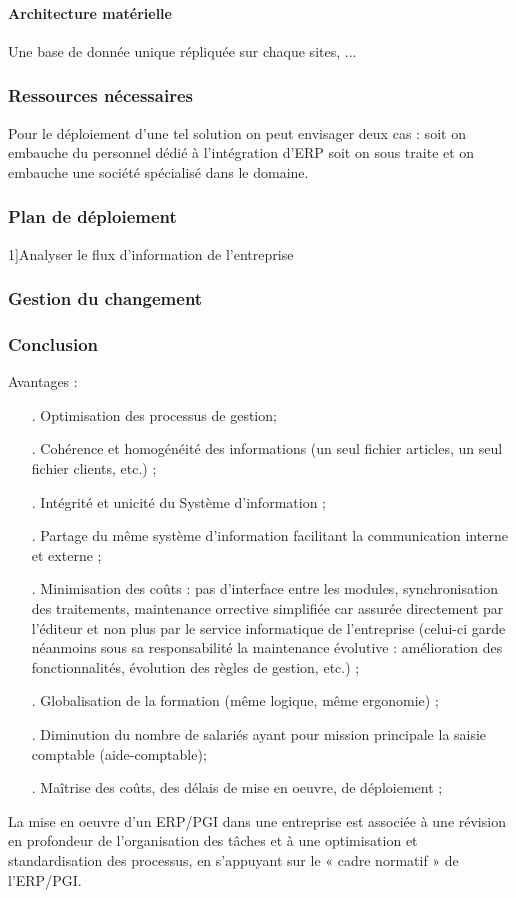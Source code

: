 \paragraph{Architecture matérielle}
Une base de donnée unique répliquée sur chaque sites, ...
\subsubsection{Ressources nécessaires}
Pour le déploiement d'une tel solution on peut envisager deux cas : soit on embauche du personnel dédié à l'intégration d'ERP soit on sous traite et on embauche une société spécialisé dans le domaine.
\subsubsection{Plan de déploiement}
1]Analyser le flux d'information de l'entreprise
\subsubsection{Gestion du changement}

\subsubsection{Conclusion}
Avantages :
\begin{itemize}
\item[.]Optimisation des processus de gestion;
\item[.]Cohérence et homogénéité des informations (un seul fichier articles, un seul fichier clients, etc.) ;
\item[.]Intégrité et unicité du Système d'information ;
\item[.]Partage du même système d’information facilitant la communication interne et externe ;
\item[.]Minimisation des coûts : pas d’interface entre les modules, synchronisation des traitements, maintenance orrective simplifiée car assurée directement par l'éditeur et non plus par le service informatique de l'entreprise (celui-ci garde néanmoins sous sa responsabilité la maintenance évolutive : amélioration des fonctionnalités, évolution des règles de gestion, etc.) ;
\item[.]Globalisation de la formation (même logique, même ergonomie) ;
\item[.]Diminution du nombre de salariés ayant pour mission principale la saisie comptable (aide-comptable);
\item[.]Maîtrise des coûts, des délais de mise en oeuvre, de déploiement ;\\
\end{itemize}
La mise en oeuvre d'un ERP/PGI dans une entreprise est associée à une révision en profondeur de l'organisation des tâches et à une optimisation et standardisation des processus, en s'appuyant sur le « cadre normatif » de l'ERP/PGI.\\

